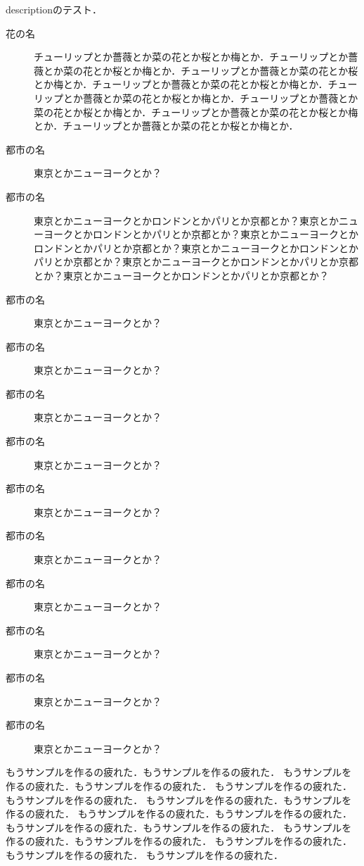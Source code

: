 descriptionのテスト．
\begin{description}
    \item[花の名] チューリップとか薔薇とか菜の花とか桜とか梅とか．チューリップとか薔薇とか菜の花とか桜とか梅とか．チューリップとか薔薇とか菜の花とか桜とか梅とか．チューリップとか薔薇とか菜の花とか桜とか梅とか．チューリップとか薔薇とか菜の花とか桜とか梅とか．チューリップとか薔薇とか菜の花とか桜とか梅とか．チューリップとか薔薇とか菜の花とか桜とか梅とか．チューリップとか薔薇とか菜の花とか桜とか梅とか．
    \item[都市の名] 東京とかニューヨークとか？
    \item[都市の名] 東京とかニューヨークとかロンドンとかパリとか京都とか？東京とかニューヨークとかロンドンとかパリとか京都とか？東京とかニューヨークとかロンドンとかパリとか京都とか？東京とかニューヨークとかロンドンとかパリとか京都とか？東京とかニューヨークとかロンドンとかパリとか京都とか？東京とかニューヨークとかロンドンとかパリとか京都とか？
    \item[都市の名] 東京とかニューヨークとか？
    \item[都市の名] 東京とかニューヨークとか？
    \item[都市の名] 東京とかニューヨークとか？
    \item[都市の名] 東京とかニューヨークとか？
    \item[都市の名] 東京とかニューヨークとか？
    \item[都市の名] 東京とかニューヨークとか？
    \item[都市の名] 東京とかニューヨークとか？
    \item[都市の名] 東京とかニューヨークとか？
    \item[都市の名] 東京とかニューヨークとか？
    \item[都市の名] 東京とかニューヨークとか？
\end{description}
もうサンプルを作るの疲れた．もうサンプルを作るの疲れた．
もうサンプルを作るの疲れた．もうサンプルを作るの疲れた．
もうサンプルを作るの疲れた．もうサンプルを作るの疲れた．
もうサンプルを作るの疲れた．もうサンプルを作るの疲れた．
もうサンプルを作るの疲れた．もうサンプルを作るの疲れた．
もうサンプルを作るの疲れた．もうサンプルを作るの疲れた．
もうサンプルを作るの疲れた．もうサンプルを作るの疲れた．
もうサンプルを作るの疲れた．もうサンプルを作るの疲れた．
もうサンプルを作るの疲れた．

